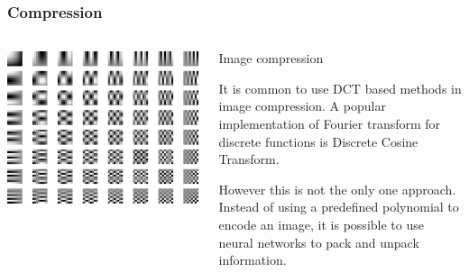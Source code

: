 \documentclass[10pt]{beamer}
\begin{document}
\begin{frame}
    \frametitle{Compression}
    \begin{columns}
        \begin{column}{0.5\textwidth}
            \includegraphics[width=\textwidth]{figure/2d-dct.png}
        \end{column}
        \begin{column}{0.5\textwidth}
            \begin{block}{Image compression}

                It is common to use DCT based methods in image compression. A popular implementation of Fourier transform for discrete functions is Discrete Cosine Transform.

                However this is not the only one approach. Instead of using a predefined polynomial to encode an image, it is possible to use neural networks to pack and unpack information.

            \end{block}
        \end{column}
    \end{columns}
\end{frame}
\end{document}
